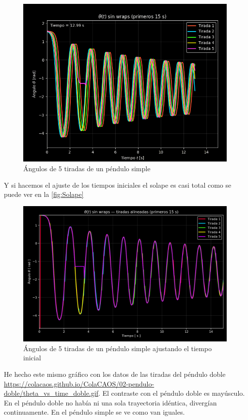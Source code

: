 \documentclass[
  10pt,
  a4paper,
  DIV=11,
  numbers=noendperiod,
  open=any]{scrreprt}
\numberwithin{equation}{chapter}
\numberwithin{equation}{section}
\renewcommand{\[}{\begin{equation}}
\renewcommand{\]}{\end{equation}}
\begin{document}
\begin{figure}[h]
  \centering
  \includegraphics[width=0.99\textwidth]{02-pendulo-doble/theta_vs_time.png}
  \caption{Ángulos de 5 tiradas de un péndulo simple}
\end{figure}


Y si hacemos el ajuste de los tiempos iniciales el solape es casi total como se puede ver en la \autoref{fig:Solape}
\begin{figure}[h]
  \centering
  \includegraphics[width=0.99\textwidth]{02-pendulo-doble/theta_alineadas_sin_wraps.png}
  \caption{Ángulos de 5 tiradas de un péndulo simple ajustando el tiempo inicial}
  \label{fig:Solape}
\end{figure}



He hecho este mismo gráfico con los datos de las tiradas del péndulo
doble \url{https://colacaos.github.io/ColaCAOS/02-pendulo-doble/theta_vs_time_doble.gif}. El contraste con el péndulo doble es mayúsculo. En el péndulo
doble no había ni una sola trayectoria idéntica, divergían
continuamente. En el péndulo simple se ve como van iguales.
\end{document}
